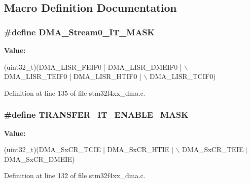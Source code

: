 \subsection{Macro Definition Documentation}
\hypertarget{group___d_m_a_ga0a11ce367da8e19eb27cf7f129da4b3d}{
\subsubsection[{D\-M\-A\-\_\-\-Stream0\-\_\-\-I\-T\-\_\-\-M\-A\-S\-K}]{\setlength{\rightskip}{0pt plus 5cm}\#define D\-M\-A\-\_\-\-Stream0\-\_\-\-I\-T\-\_\-\-M\-A\-S\-K}}\label{group___d_m_a_ga0a11ce367da8e19eb27cf7f129da4b3d}
{\bfseries Value\-:}
\begin{DoxyCode}
(uint32\_t)(DMA\_LISR\_FEIF0 | DMA\_LISR\_DMEIF0 | \(\backslash\)
                                           DMA\_LISR\_TEIF0 | DMA\_LISR\_HTIF0 | \(\backslash\)
                                           DMA\_LISR\_TCIF0)
\end{DoxyCode}


Definition at line 135 of file stm32f4xx\-\_\-dma.\-c.

\hypertarget{group___d_m_a_ga65f8cdee3cc2302bafb0a32a15692a81}{
\subsubsection[{T\-R\-A\-N\-S\-F\-E\-R\-\_\-\-I\-T\-\_\-\-E\-N\-A\-B\-L\-E\-\_\-\-M\-A\-S\-K}]{\setlength{\rightskip}{0pt plus 5cm}\#define T\-R\-A\-N\-S\-F\-E\-R\-\_\-\-I\-T\-\_\-\-E\-N\-A\-B\-L\-E\-\_\-\-M\-A\-S\-K}}\label{group___d_m_a_ga65f8cdee3cc2302bafb0a32a15692a81}
{\bfseries Value\-:}
\begin{DoxyCode}
(uint32\_t)(DMA\_SxCR\_TCIE | DMA\_SxCR\_HTIE | \(\backslash\)
                                           DMA\_SxCR\_TEIE | DMA\_SxCR\_DMEIE)
\end{DoxyCode}


Definition at line 132 of file stm32f4xx\-\_\-dma.\-c.



